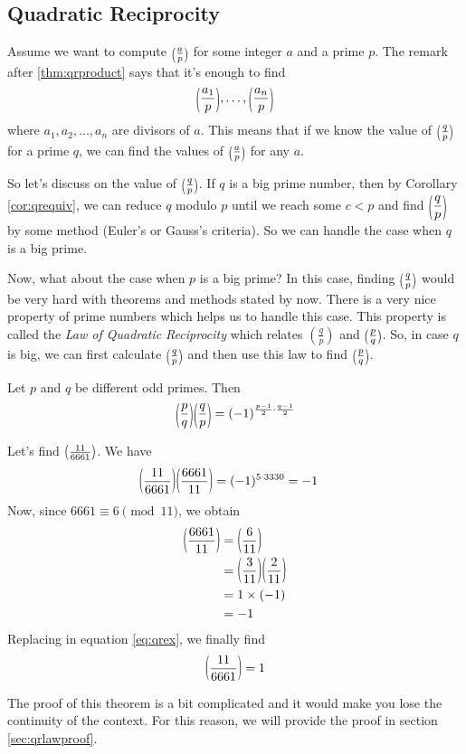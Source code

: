 \documentclass[main.tex]{subfile}
\begin{document}
	\subsection{Quadratic Reciprocity}
	Assume we want to compute $\parenthesis{\frac{a}{p}}$ for some integer $a$ and a prime $p$. The remark after \autoref{thm:qrproduct} says that it's enough to find
		\begin{align*}
			\parenthesis{\dfrac{a_1}{p}}, \ldots, \parenthesis{\dfrac{a_n}{p}}
		\end{align*}
	where $a_1,a_2,\ldots,a_n$ are divisors of $a$. This means that if we know the value of $\parenthesis{\frac{q}{p}}$ for a prime $q$, we can find the values of $\parenthesis{\frac{a}{p}}$ for any $a$.

	So let's discuss on the value of $\parenthesis{\frac{q}{p}}$. If $q$ is a big prime number, then by Corollary \ref{cor:qrequiv}, we can reduce $q$ modulo $p$ until we reach some $c<p$ and find $\parenthesis{\dfrac{q}{p}}$ by some method (Euler's or Gauss's criteria). So we can handle the case when $q$ is a big prime.

	Now, what about the case when $p$ is a big prime? In this case, finding $\parenthesis{\frac{q}{p}}$ would be very hard with theorems and methods stated by now. There is a very nice property of prime numbers which helps us to handle this case. This property is called the \textit{Law of Quadratic Reciprocity} which relates $\left(\frac{q}{p}\right)$ and $\parenthesis{\frac{p}{q}}$. So, in case $q$ is big, we can first calculate $\parenthesis{\frac{q}{p}}$ and then use this law to find $\parenthesis{\frac{p}{q}}$.

	\begin{theorem}\label{thm:lawofqr}
		Let $p$ and $q$ be different odd primes. Then
		\begin{align*}
			\parenthesis{\dfrac{p}{q}}\parenthesis{\dfrac{q}{p}}=(-1)^{\frac{p-1}{2}\cdot \frac{q-1}{2}}
		\end{align*}
	\end{theorem}

	\begin{example}
		Let's find $\parenthesis{\frac{11}{6661}}$. We have
		\begin{align}\label{eq:qrex}
			\parenthesis{\dfrac{11}{6661}}\parenthesis{\dfrac{6661}{11}}
				& =(-1)^{5\cdot 3330}=-1
		\end{align}
		Now, since $6661 \equiv 6 \pmod{11}$, we obtain
		\begin{align*}
		\parenthesis{\dfrac{6661}{11}}
			& = \parenthesis{\dfrac{6}{11}}\\
			& = \parenthesis{\dfrac{3}{11}}\parenthesis{\dfrac{2}{11}}\\
			& =1 \times (-1)\\
			& = -1
		\end{align*}
		Replacing in equation \eqref{eq:qrex}, we finally find
		\begin{align*}
			\parenthesis{\dfrac{11}{6661}} = 1
		\end{align*}
	\end{example}
	The proof of this theorem is a bit complicated and it would make you lose the continuity of the context. For this reason, we will provide the proof in section \eqref{sec:qrlawproof}.
\end{document}
